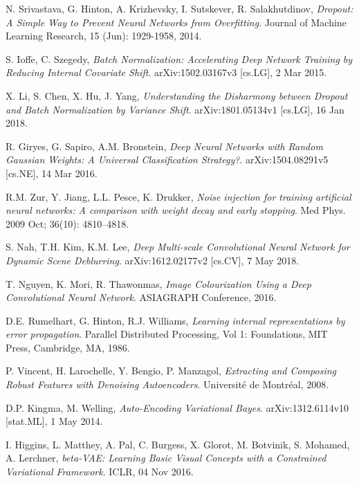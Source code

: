 \documentclass[a4paper]{article}
\begin{document}
\begin{thebibliography}{999}
  N. Srivastava, G. Hinton, A. Krizhevsky, I. Sutskever, R. Salakhutdinov,
  \emph{Dropout: A Simple Way to Prevent Neural Networks from Overfitting}.
  Journal of Machine Learning Research, 
  15 (Jun): 1929-1958, 2014.

  S. Ioffe, C. Szegedy,
  \emph{Batch Normalization: Accelerating Deep Network Training by Reducing Internal Covariate Shift}.
  arXiv:1502.03167v3 [cs.LG],
  2 Mar 2015.

X. Li, S. Chen, X. Hu, J. Yang,
\emph{Understanding the Disharmony between Dropout and Batch Normalization by Variance Shift}.
arXiv:1801.05134v1 [cs.LG],
16 Jan 2018.

  R. Giryes, G. Sapiro, A.M. Bronstein,
  \emph{Deep Neural Networks with Random Gaussian Weights: A Universal Classification Strategy?}.
  arXiv:1504.08291v5 [cs.NE],
  14 Mar 2016.

  R.M. Zur, Y. Jiang, L.L. Pesce, K. Drukker,
  \emph{Noise injection for training artificial neural networks: A comparison with weight decay and early stopping}.
  Med Phys.
  2009 Oct;
  36(10): 4810–4818.

  S. Nah, T.H. Kim, K.M. Lee,
  \emph{Deep Multi-scale Convolutional Neural Network for Dynamic Scene Deblurring}.
  arXiv:1612.02177v2 [cs.CV],
  7 May 2018.

  T. Nguyen, K. Mori, R. Thawonmas,
  \emph{Image Colourization Using a Deep Convolutional Neural Network}.
  ASIAGRAPH Conference,
  2016.

  D.E. Rumelhart, G. Hinton, R.J. Williams,
  \emph{Learning internal representations by error propagation}.
  Parallel Distributed Processing,
  Vol 1: Foundations,
  MIT Press,
  Cambridge, MA,
  1986.

  P. Vincent, H. Larochelle, Y. Bengio, P. Manzagol,
  \emph{Extracting and Composing Robust Features with Denoising Autoencoders}.
  Universit\'e de Montr\'eal,
  2008.

  D.P. Kingma, M. Welling,
  \emph{Auto-Encoding Variational Bayes}.
  arXiv:1312.6114v10 [stat.ML],
  1 May 2014.

  I. Higgins, L. Matthey, A. Pal, C. Burgess, X. Glorot, M. Botvinik, S. Mohamed, A. Lerchner,
  \emph{beta-VAE: Learning Basic Visual Concepts with a Constrained Variational Framework}.
  ICLR,
  04 Nov 2016.


\end{thebibliography}
\end{document}
